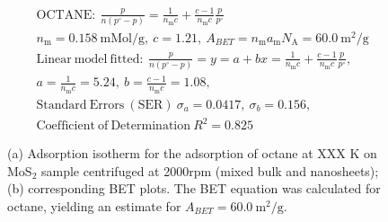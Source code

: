 

\begin{align*}
&\mathrm{OCTANE:}\ \frac{p}{n(p^\circ-p)}=\frac{1}{n_\mathrm{m}c}+\frac{c-1}{n_\mathrm{m}c}\frac{p}{p^\circ}\\
&{n_\mathrm{m}}=0.158\ \mathrm{mMol/g},\ c=1.21,\ A_{BET}={n_\mathrm{m}}{a_\mathrm{m}}{N_\mathrm{A}}=60.0\ \mathrm{m}^2\mathrm{/g}\\
&\mathrm{Linear\ model\ fitted:}\ \frac{p}{n(p^\circ-p)}=y=a+bx=\frac{1}{n_\mathrm{m}c}+\frac{c-1}{n_\mathrm{m}c}\frac{p}{p^\circ},\\
&a=\frac{1}{n_\mathrm{m}c}=5.24,\ b=\frac{c-1}{n_\mathrm{m}c}=1.08,\\
&\mathrm{Standard\ Errors\ (SER)}\ \sigma_a=0.0417,\ \sigma_b=0.156,\\
&\mathrm{Coefficient\ of\ Determination}\ R^2 = 0.825
\end{align*}


\begin{figure}[htb]
\hfill
{}
\caption{(a) Adsorption isotherm for the adsorption of octane at XXX K on MoS$_2$ 
sample centrifuged at 2000rpm (mixed bulk and nanosheets);
(b) corresponding BET plots. The BET equation was calculated for octane, yielding an estimate for $A_{BET}=60.0\ \mathrm{m}^2\mathrm{/g}$.}

\label{fig:sa-Nanosheets-Prep-II-2000rpm-12mg-01-3mm-30C-S1-SA-10ml}
\end{figure}


